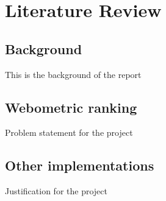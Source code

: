 \chapter{Literature Review}
\section{Background}
This is the background of the report
\section{Webometric ranking}
Problem statement for the project
\section{Other implementations}
Justification for the project